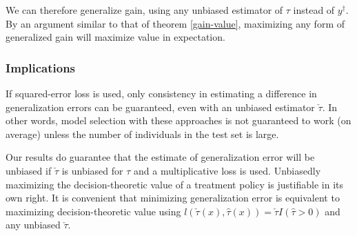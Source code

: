We can therefore generalize gain, using any unbiased estimator of $\tau$ instead of $y^{\dagger}$. By an argument similar to that of theorem \ref{gain-value}, maximizing any form of generalized gain will maximize value in expectation.

\subsubsection{Implications}

If squared-error loss is used, only consistency in estimating a difference in generalization errors can be guaranteed, even with an unbiased estimator $\check\tau$. In other words, model selection with these approaches is not guaranteed to work (on average) unless the number of individuals in the test set is large.

Our results do guarantee that the estimate of generalization error will be unbiased if $\check\tau$ is unbiased for $\tau$ and a multiplicative loss is used. Unbiasedly maximizing the decision-theoretic value of a treatment policy is justifiable in its own right. It is convenient that minimizing generalization error is equivalent to maximizing decision-theoretic value using $l(\check\tau(x), \hat\tau(x))  = \check\tau I(\hat\tau > 0)$ and any unbiased $\check\tau$.

